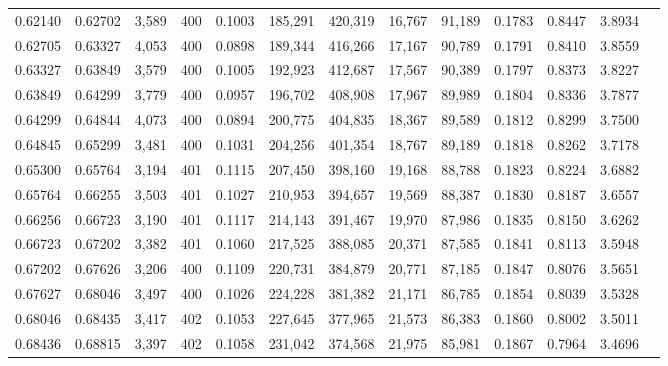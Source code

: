 \begin{tabular}{rrrrrrrrrrrrr}
0.62140 & 0.62702 & 3,589 & 400 &                                     0.1003 & 185,291 & 420,319 &  16,767 &  91,189 & 0.1783 & 0.8447 & 3.8934 \\
0.62705 & 0.63327 & 4,053 & 400 &                                     0.0898 & 189,344 & 416,266 &  17,167 &  90,789 & 0.1791 & 0.8410 & 3.8559 \\
0.63327 & 0.63849 & 3,579 & 400 &                                     0.1005 & 192,923 & 412,687 &  17,567 &  90,389 & 0.1797 & 0.8373 & 3.8227 \\
0.63849 & 0.64299 & 3,779 & 400 &                                     0.0957 & 196,702 & 408,908 &  17,967 &  89,989 & 0.1804 & 0.8336 & 3.7877 \\
0.64299 & 0.64844 & 4,073 & 400 &                                     0.0894 & 200,775 & 404,835 &  18,367 &  89,589 & 0.1812 & 0.8299 & 3.7500 \\
0.64845 & 0.65299 & 3,481 & 400 &                                     0.1031 & 204,256 & 401,354 &  18,767 &  89,189 & 0.1818 & 0.8262 & 3.7178 \\
0.65300 & 0.65764 & 3,194 & 401 &                                     0.1115 & 207,450 & 398,160 &  19,168 &  88,788 & 0.1823 & 0.8224 & 3.6882 \\
0.65764 & 0.66255 & 3,503 & 401 &                                     0.1027 & 210,953 & 394,657 &  19,569 &  88,387 & 0.1830 & 0.8187 & 3.6557 \\
0.66256 & 0.66723 & 3,190 & 401 &                                     0.1117 & 214,143 & 391,467 &  19,970 &  87,986 & 0.1835 & 0.8150 & 3.6262 \\
0.66723 & 0.67202 & 3,382 & 401 &                                     0.1060 & 217,525 & 388,085 &  20,371 &  87,585 & 0.1841 & 0.8113 & 3.5948 \\
0.67202 & 0.67626 & 3,206 & 400 &                                     0.1109 & 220,731 & 384,879 &  20,771 &  87,185 & 0.1847 & 0.8076 & 3.5651 \\
0.67627 & 0.68046 & 3,497 & 400 &                                     0.1026 & 224,228 & 381,382 &  21,171 &  86,785 & 0.1854 & 0.8039 & 3.5328 \\
0.68046 & 0.68435 & 3,417 & 402 &                                     0.1053 & 227,645 & 377,965 &  21,573 &  86,383 & 0.1860 & 0.8002 & 3.5011 \\
0.68436 & 0.68815 & 3,397 & 402 &                                     0.1058 & 231,042 & 374,568 &  21,975 &  85,981 & 0.1867 & 0.7964 & 3.4696 \\

\end{tabular}
